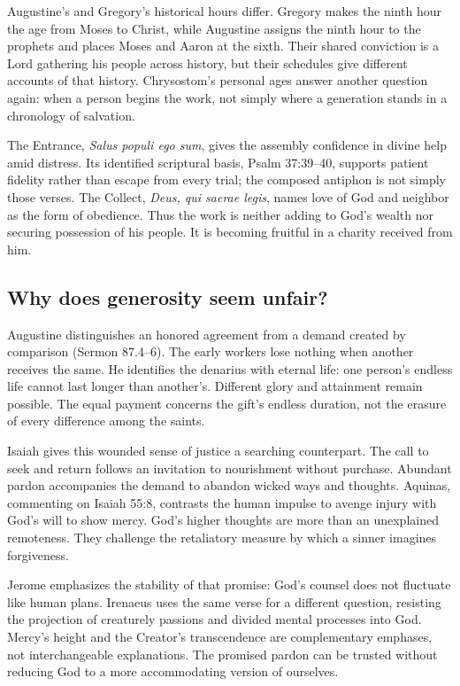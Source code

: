 Augustine's and Gregory's historical hours differ. Gregory makes the ninth hour the age from Moses to Christ, while Augustine assigns the ninth hour to the prophets and places Moses and Aaron at the sixth. Their shared conviction is a Lord gathering his people across history, but their schedules give different accounts of that history. Chrysostom's personal ages answer another question again: when a person begins the work, not simply where a generation stands in a chronology of salvation.

The Entrance, \textit{Salus populi ego sum}, gives the assembly confidence in divine help amid distress. Its identified scriptural basis, Psalm 37:39--40, supports patient fidelity rather than escape from every trial; the composed antiphon is not simply those verses. The Collect, \textit{Deus, qui sacrae legis}, names love of God and neighbor as the form of obedience. Thus the work is neither adding to God's wealth nor securing possession of his people. It is becoming fruitful in a charity received from him.

\subsection{Why does generosity seem unfair?}
Augustine distinguishes an honored agreement from a demand created by comparison (Sermon 87.4--6). The early workers lose nothing when another receives the same. He identifies the denarius with eternal life: one person's endless life cannot last longer than another's. Different glory and attainment remain possible. The equal payment concerns the gift's endless duration, not the erasure of every difference among the saints.

Isaiah gives this wounded sense of justice a searching counterpart. The call to seek and return follows an invitation to nourishment without purchase. Abundant pardon accompanies the demand to abandon wicked ways and thoughts. Aquinas, commenting on Isaiah 55:8, contrasts the human impulse to avenge injury with God's will to show mercy. God's higher thoughts are more than an unexplained remoteness. They challenge the retaliatory measure by which a sinner imagines forgiveness.

Jerome emphasizes the stability of that promise: God's counsel does not fluctuate like human plans. Irenaeus uses the same verse for a different question, resisting the projection of creaturely passions and divided mental processes into God. Mercy's height and the Creator's transcendence are complementary emphases, not interchangeable explanations. The promised pardon can be trusted without reducing God to a more accommodating version of ourselves.

